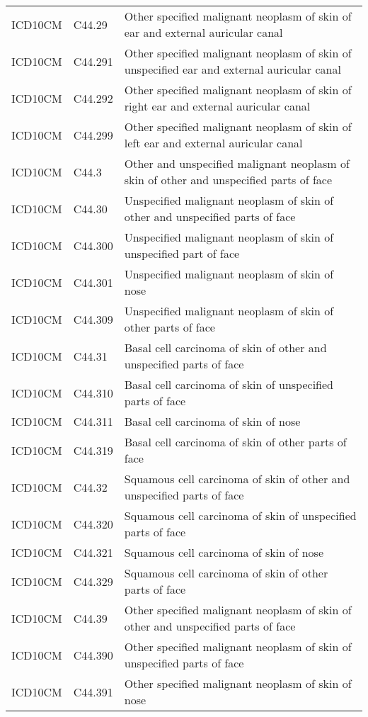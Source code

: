 \begin{longtable}{p{}p{}p{}}
  ICD10CM & C44.29 & Other specified malignant neoplasm of skin of ear and external auricular canal \\ 
  ICD10CM & C44.291 & Other specified malignant neoplasm of skin of unspecified ear and external auricular canal \\ 
  ICD10CM & C44.292 & Other specified malignant neoplasm of skin of right ear and external auricular canal \\ 
  ICD10CM & C44.299 & Other specified malignant neoplasm of skin of left ear and external auricular canal \\ 
  ICD10CM & C44.3 & Other and unspecified malignant neoplasm of skin of other and unspecified parts of face \\ 
  ICD10CM & C44.30 & Unspecified malignant neoplasm of skin of other and unspecified parts of face \\ 
  ICD10CM & C44.300 & Unspecified malignant neoplasm of skin of unspecified part of face \\ 
  ICD10CM & C44.301 & Unspecified malignant neoplasm of skin of nose \\ 
  ICD10CM & C44.309 & Unspecified malignant neoplasm of skin of other parts of face \\ 
  ICD10CM & C44.31 & Basal cell carcinoma of skin of other and unspecified parts of face \\ 
  ICD10CM & C44.310 & Basal cell carcinoma of skin of unspecified parts of face \\ 
  ICD10CM & C44.311 & Basal cell carcinoma of skin of nose \\ 
  ICD10CM & C44.319 & Basal cell carcinoma of skin of other parts of face \\ 
  ICD10CM & C44.32 & Squamous cell carcinoma of skin of other and unspecified parts of face \\ 
  ICD10CM & C44.320 & Squamous cell carcinoma of skin of unspecified parts of face \\ 
  ICD10CM & C44.321 & Squamous cell carcinoma of skin of nose \\ 
  ICD10CM & C44.329 & Squamous cell carcinoma of skin of other parts of face \\ 
  ICD10CM & C44.39 & Other specified malignant neoplasm of skin of other and unspecified parts of face \\ 
  ICD10CM & C44.390 & Other specified malignant neoplasm of skin of unspecified parts of face \\ 
  ICD10CM & C44.391 & Other specified malignant neoplasm of skin of nose \\ 

\end{longtable}
